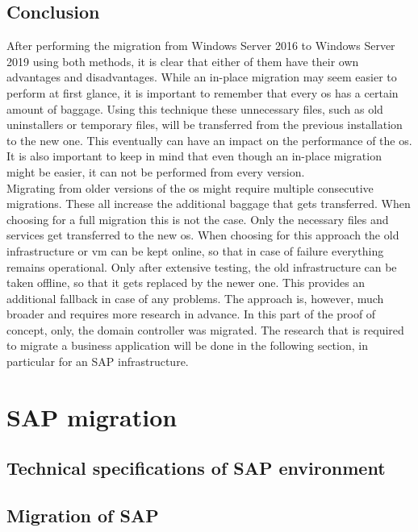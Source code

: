 \subsection{Conclusion}
After performing the migration from Windows Server 2016 to Windows Server 2019 using both methods, it is clear that either of them have their own advantages and disadvantages. While an in-place migration may seem easier to perform at first glance, it is important to remember that every \acrshort{os} has a certain amount of baggage. Using this technique these unnecessary files, such as old uninstallers or temporary files, will be transferred from the previous installation to the new one. This eventually can have an impact on the performance of the \acrshort{os}. It is also important to keep in mind that even though an in-place migration might be easier, it can not be performed from every version.
\\
Migrating from older versions of the \acrshort{os} might require multiple consecutive migrations. These all increase the additional baggage that gets transferred. When choosing for a full migration this is not the case. Only the necessary files and services get transferred to the new \acrshort{os}. When choosing for this approach the old infrastructure or \acrshort{vm} can be kept online, so that in case of failure everything remains operational. Only after extensive testing, the old infrastructure can be taken offline, so that it gets replaced by the newer one. This provides an additional fallback in case of any problems. The approach is, however, much broader and requires more research in advance. In this part of the proof of concept, only, the domain controller was migrated. The research that is required to migrate a business application will be done in the following section, in particular for an SAP infrastructure. 
\clearpage

\section{SAP migration}
\subsection{Technical specifications of SAP environment}
\subsection{Migration of SAP}

\clearpage

